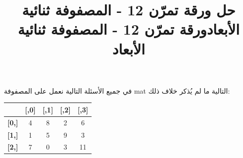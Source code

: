 \documentclass[14pt]{extarticle}
\title{حل ورقة تمرّن 12 - المصفوفة ثنائية الأبعاد}
\title{ورقة تمرّن 12 - المصفوفة ثنائية الأبعاد}
\begin{document}
\maketitle
\thispagestyle{fancy}

في جميع الأسئلة التالية نعمل على المصفوفة \textenglish{mat} التالية ما لم يُذكر خلاف ذلك:

\begin{center}
\begin{english}
\begin{tabular}{c|cccc}
 & \textbf{[,0]} & \textbf{[,1]} & \textbf{[,2]} & \textbf{[,3]} \\
\hline
\textbf{[0,]} & 4  & 8  & 2  & 6  \\
\textbf{[1,]} & 1  & 5  & 9  & 3  \\
\textbf{[2,]} & 7  & 0  & 3  & 11 \\
\end{tabular}
\end{english}
\end{center}
\end{document}
